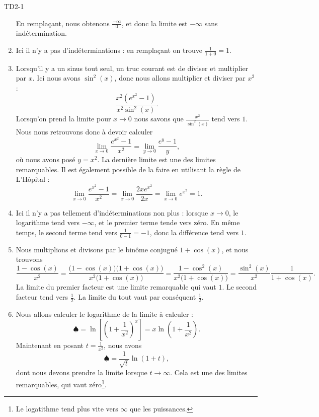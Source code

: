 \begin{corrige}{TD2-1}
\begin{enumerate}
			En remplaçant, nous obtenons $\frac{ -\infty }{  0}$, et donc la limite est $-\infty$ sans indétermination.
		\item
			Ici il n'y a pas d'indéterminations : en remplaçant on trouve $\frac{ 1 }{ 1+0 }=1$.
		\item
			Lorsqu'il y a un sinus tout seul, un truc courant est de diviser et multiplier par $x$. Ici nous avons $\sin^2(x)$, donc nous allons multiplier et diviser par $x^2$ :
			\begin{equation}
				\frac{ x^2( e^{x^2}-1) }{ x^2\sin^2(x) }.
			\end{equation}
			Lorsqu'on prend la limite pour $x\to 0$ nous savons que $\frac{ x^2 }{ \sin^2(x) }$ tend vers $1$. Nous nous retrouvons donc à devoir calculer
			\begin{equation}
				\lim_{x\to 0} \frac{  e^{x^2}-1 }{ x^2 }=\lim_{y\to 0}\frac{ e^y-1 }{ y }, 
			\end{equation}
			où nous avons posé $y=x^2$. La dernière limite est une des limites remarquables. Il est également possible de la faire en utilisant la règle de L'Hôpital :
            \begin{equation}
                \lim_{x\to 0} \frac{  e^{x^2}-1 }{ x^2 }=\lim_{x\to 0} \frac{ 2x e^{x^2} }{ 2x }=\lim_{x\to 0}  e^{x^2}=1.
            \end{equation}
		\item
			Ici il n'y a pas tellement d'indéterminations non plus : lorsque $x\to 0$, le logarithme tend vers $-\infty$, et le premier terme tende vers zéro. En même temps, le second terme tend vers $\frac{1}{ 0-1 }=-1$, donc la différence tend vers $1$.
		\item
			Nous multiplions et divisons par le binôme conjugué $1+\cos(x)$, et nous trouvons
			\begin{equation}
                \frac{ 1-\cos(x) }{ x^2 }=\frac{ \big( 1-\cos(x) \big)\big( 1+\cos(x) \big) }{ x^2\big( 1+\cos(x) \big) }=\frac{ 1-\cos^2(x) }{ x^2\big( 1+\cos(x) \big) }=\frac{ \sin^2(x) }{ x^2 }\frac{1}{ 1+\cos(x) }.
			\end{equation}
            La limite du premier facteur est une limite remarquable qui vaut \( 1\). Le second facteur tend vers \( \frac{ 1 }{2}\). La limite du tout vaut par conséquent \( \frac{ 1 }{2}\).
		\item
			Nous allons calculer le logarithme de la limite à calculer :
            \begin{equation}        \label{EqBtkUpe}
				\spadesuit=\ln\left[ \left( 1+\frac{1}{ x^2 } \right)^x \right]=x\ln\left( 1+\frac{1}{ x^2 } \right).
			\end{equation}
			Maintenant en posant $t=\frac{1}{ x^2 }$, nous avons
			\begin{equation}
				\spadesuit=\frac{1}{ \sqrt{t} }\ln(1+t),
			\end{equation}
            dont nous devons prendre la limite lorsque $t\to \infty$. Cela est une des limites remarquables, qui vaut zéro\footnote{Le logatithme tend plus vite vers \( \infty\) que les puissances.}.


\end{enumerate}
\end{corrige}

